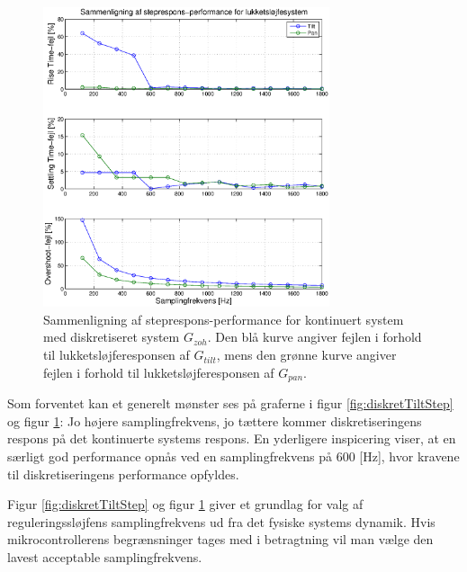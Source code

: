 \begin{figure}[!th]
\centering
	\includegraphics[width=0.75\textwidth]{./graphics/diskretStepFreq.eps}
\captionsetup{width=0.75\textwidth}
\caption[Sammenligning af performance mellem kontinuert og diskretiseret system]
{Sammenligning af steprespons-performance for kontinuert system med diskretiseret system \(G_{zoh}\).
Den blå kurve angiver fejlen i forhold til lukketsløjferesponsen af $G_{tilt}$,
mens den grønne kurve angiver fejlen i forhold til lukketsløjferesponsen af $G_{pan}$.
}
\label{fig:diskretStepFreq}
\end{figure}

Som forventet kan et generelt mønster ses på graferne i figur \ref{fig:diskretTiltStep} og figur \ref{fig:diskretStepFreq}:
Jo højere samplingfrekvens, jo tættere kommer diskretiseringens respons på det kontinuerte systems respons.
En yderligere inspicering viser, at en særligt god performance opnås ved en samplingfrekvens på 600 [Hz],
hvor kravene til diskretiseringens performance opfyldes.

Figur \ref{fig:diskretTiltStep} og figur \ref{fig:diskretStepFreq}
giver et grundlag for valg af reguleringssløjfens samplingfrekvens ud fra det fysiske systems dynamik.
Hvis mikrocontrollerens begrænsninger tages med i betragtning vil man vælge den lavest acceptable
samplingfrekvens.

